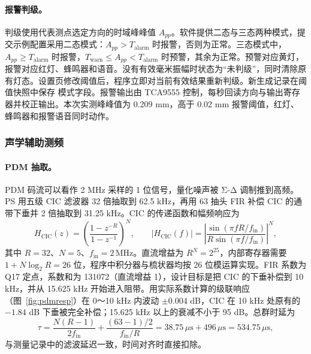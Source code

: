 \paragraph{报警判级。}判级使用代表测点选定方向的时域峰峰值 $A_{pp}$。软件提供二态与三态两种模式，提交示例配置采用二态模式：$A_{pp}>T_{\mathrm{alarm}}$ 时报警，否则为正常。三态模式中，$A_{pp}\ge T_{\mathrm{alarm}}$ 时报警，$T_{\mathrm{warn}}\le A_{pp}<T_{\mathrm{alarm}}$ 时预警，其余为正常。预警对应黄灯，报警对应红灯、蜂鸣器和语音。没有有效毫米振幅时状态为“未判级”，同时清除原有灯态。设置页修改阈值后，程序立即对当前有效结果重新判级。新生成记录在阈值快照中保存  模式字段。报警输出由 TCA9555 控制，每秒回读方向与输出寄存器并校正输出。本次实测峰峰值为 0.209 mm，高于 0.02 mm 报警阈值，红灯、蜂鸣器和报警语音同时动作。

\subsubsection{声学辅助测频}
\label{sec:acoustic}

\paragraph{PDM 抽取。}PDM 码流可以看作 2 MHz 采样的 1 位信号，量化噪声被 Σ-Δ 调制推到高频。PS 用五级 CIC 滤波器 32 倍抽取到 62.5 kHz，再用 63 抽头 FIR 补偿 CIC 的通带下垂并 2 倍抽取到 31.25 kHz\cite{hogenauer1981}。CIC 的传递函数和幅频响应为
\begin{equation}
H_{\mathrm{CIC}}(z)=\left(\frac{1-z^{-R}}{1-z^{-1}}\right)^{N},\qquad
\bigl\lvert H_{\mathrm{CIC}}(f)\bigr\rvert=\left\lvert\frac{\sin(\pi fR/f_{\mathrm{in}})}{R\sin(\pi f/f_{\mathrm{in}})}\right\rvert^{N},
\end{equation}
其中 $R=32$、$N=5$、$f_{\mathrm{in}}=2\,\mathrm{MHz}$。直流增益为 $R^N=2^{25}$，内部寄存器需要 $1+N\log_2R=26$ 位，程序中积分器与梳状器均按 26 位模运算实现。FIR 系数为 Q17 定点，系数和为 131072（直流增益 1），设计目标是把 CIC 的下垂补偿到 10 kHz，并从 15.625 kHz 开始进入阻带。用实际系数计算的级联响应（图~\ref{fig:pdmresp}）在 0～10 kHz 内波动 $\pm0.004$ dB，CIC 在 10 kHz 处原有的 $-1.84$ dB 下垂被完全补偿；15.625 kHz 以上的衰减不小于 95 dB。总群时延为
\begin{equation}
\tau=\frac{N(R-1)}{2f_{\mathrm{in}}}+\frac{(63-1)/2}{f_{\mathrm{in}}/R}=38.75\,\mu\mathrm{s}+496\,\mu\mathrm{s}=534.75\,\mu\mathrm{s},
\end{equation}
与测量记录中的滤波延迟一致，时间对齐时直接扣除。

